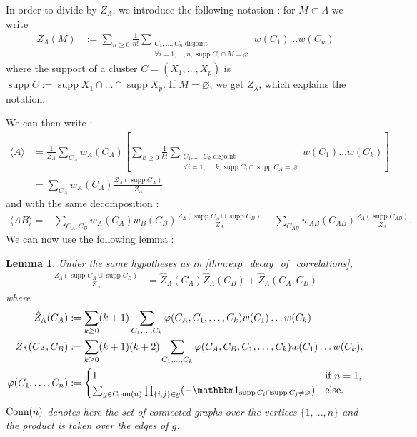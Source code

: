 \documentclass[french]{article}
\newtheorem{lem}{Lemma}
\DeclareMathOperator{\disj}{disjoint}
\DeclareMathOperator{\supp}{supp}
\begin{document}
    In order to divide by $Z_\Lambda$, we introduce the following notation : for $M\subset \Lambda$ we write
    \begin{align*}
        Z_\Lambda(M)&:=\sum_{n\geq0}\frac 1{n!} \sum_{\substack{
            C_1,\ldots,C_n \disj\\
            \forall i=1,\ldots,n, \supp C_i\cap M =\varnothing
            }}w(C_1)\ldots w(C_n)
    \end{align*}
    where the support of a cluster $C=(X_1,\ldots,X_p)$ is $\supp C:=\supp X_1\cap\ldots\cap\supp X_p$.
    If $M=\varnothing$, we get $Z_\lambda$, which explains the notation.
    
    We can then write :
    \begin{align*}
        \langle A\rangle &= \frac 1 {Z_\Lambda}\sum_{C_A}w_A(C_A)\left[\sum_{k\geq 0} \frac 1{k!}\sum_{\substack{C_1,\ldots,C_k\disj\\\forall i=1,\ldots,k, \supp C_i\cap \supp C_A=\varnothing}}w(C_1)\ldots w(C_k)\right]\\
        &=\sum_{C_A}w_A(C_A)\frac{Z_\Lambda(\supp C_A)}{Z_\Lambda}
    \end{align*}
    and with the same decomposition :
    \begin{align*}
        \langle AB\rangle=& \sum_{C_{A},C_B}w_A(C_A)w_B(C_B)\frac{Z_\Lambda(\supp C_A \cup \supp C_B)}{Z_\Lambda}+\sum_{C_{AB}}w_{AB}(C_{AB})\frac{Z_\Lambda(\supp C_{AB})}{Z_\Lambda}.
    \end{align*}
    We can now use the following lemma :
    \begin{lem}
        Under the same hypotheses as in \cref{thm:exp_decay_of_correlations},
        \begin{align*}
            \frac{Z_\Lambda(\supp C_A\cup \supp C_B)}{Z_\Lambda}&=\hat Z_\Lambda(C_A)\hat Z_\Lambda(C_B)+\hat Z_\Lambda(C_A,C_B)
        \end{align*}
        where \begin{align*}
            \hat Z_\Lambda(C_A)&:=\sum_{k\geq 0}(k+1)\sum_{C_1,\ldots,C_k}\varphi(C_A,C_1,\ldots,C_k)w(C_1)\ldots w(C_k)\\
            \hat Z_\Lambda(C_A,C_B)&:=\sum_{k\geq 0}(k+1)(k+2)\sum_{C_1,\ldots,C_k}\varphi(C_A,C_B,C_1,\ldots,C_k)w(C_1)\ldots w(C_k),\\
            \varphi(C_1,\ldots,C_n)&:=\begin{cases}
                1&\textnormal{if $n=1$,}\\
                \sum_{g\in \textnormal{Conn}(n)}\prod_{\{i,j\}\in g}(-\mathbbm 1_{\supp C_i\cap \supp C_j\neq \varnothing})&\textnormal{else.}
            \end{cases}
        \end{align*}
        $\textnormal{Conn}(n)$ denotes here the set of connected graphs over the vertices $\{1,\ldots,n\}$ and the product is taken over the edges of $g$.
    \end{lem}
\end{document}
